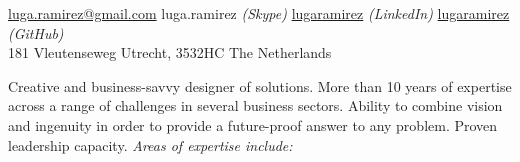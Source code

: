 \documentclass[10pt,a4paper]{article} %
\begin{document}
 



\noindent\href{mailto:luga.ramirez@gmail.com}{luga.ramirez@gmail.com}
\bull luga.ramirez \textit{(Skype)}
\bull \href{https://www.linkedin.com/in/lugaramirez/}{lugaramirez} \textit{(LinkedIn)}
\bull \href{https://github.com/lugaramirez}{lugaramirez} \textit{(GitHub)}\\
181 Vleutenseweg
\bull Utrecht, 3532HC
\bull The Netherlands %

\spacedhrule{0.9em}{-0.4em} %



Creative and business-savvy designer of solutions. More than 10 years of expertise across a range of challenges in several business sectors. Ability to combine vision and ingenuity in order to provide a future-proof answer to any problem. Proven leadership capacity. \textit{Areas of expertise include:}

\vspace{-1em} %
\begin{multicols}{2}  %
{}
\end{multicols}
\end{document}
